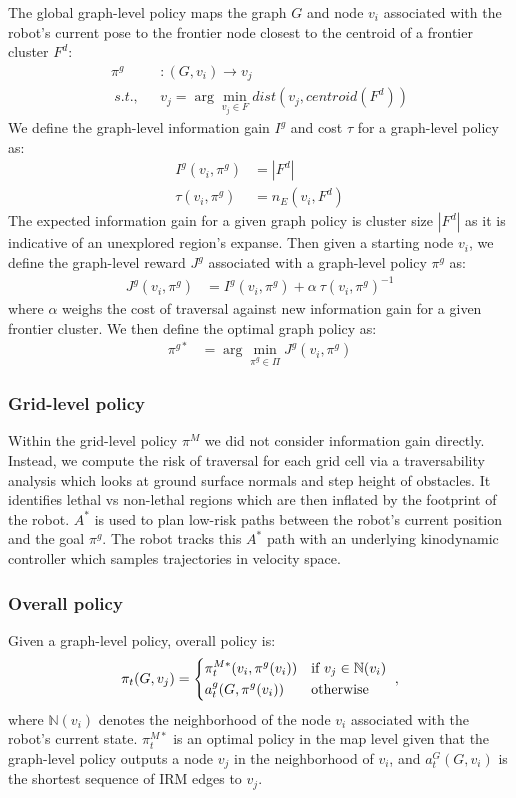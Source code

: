 \documentclass{article}
\begin{document}
The global graph-level policy maps the graph $G$ and node $v_i$ associated with the robot's current pose to the frontier node closest to the centroid of a frontier cluster $F^d$:
\begin{align}
  \pi^g&: (G,v_i) \rightarrow v_{j} \nonumber \\
  ~s.t.,~~~ &v_j= \arg\min_{v_j \in F} dist(v_{j}, centroid(F^d))
\end{align}
We define the graph-level information gain $I^g$ and cost $\tau$ for a graph-level policy as:
\begin{align}
    I^g(v_i,\pi^g) &= |F^d| \nonumber \\
    \tau(v_i,\pi^g) &= n_E(v_i,F^d) 
\end{align}
The expected information gain for a given graph policy is cluster size $|F^d|$ as it is indicative of an unexplored region's expanse. Then given a starting node $v_i$, we define the graph-level reward $J^g$ associated with a graph-level policy $\pi^g$ as: 
\begin{align}
    J^{g}(v_i, \pi^g) &= I^g(v_i,\pi^g) + \alpha~\tau(v_i,\pi^g)^{-1}
\end{align}
where $\alpha$ weighs the cost of traversal against new information gain for a given frontier cluster. We then define the optimal graph policy as:
\begin{align}
    \pi^{g*} &= \arg\min_{\pi^g \in \Pi} J^{g}(v_i, \pi^g) \nonumber
\end{align}

\subsubsection{Grid-level policy}
Within the grid-level policy $\pi^M$ we did not consider information gain directly.  Instead, we compute the risk of traversal for each grid cell via a traversability analysis which looks at ground surface normals and step height of obstacles.  It identifies lethal vs non-lethal regions which are then inflated by the footprint of the robot.  $A^*$ is used to plan low-risk paths between the robot's current position and the goal $\pi^g$.  The robot tracks this $A^*$ path with an underlying kinodynamic controller which samples trajectories in velocity space.

\subsubsection{Overall policy}
Given a graph-level policy, overall policy is:
\begin{align}
  \pi_t(G, v_j) = 
  \begin{dcases*}
    \pi_t^{M*}(v_i, \pi^g(v_i)) & if $v_j \in \mathbb{N}(v_i)$ \\
    a_t^g(G, \pi^g(v_i)) & otherwise 
  \end{dcases*},
\end{align}
where $\mathbb{N}(v_i)$ denotes the neighborhood of the node $v_i$ associated with the robot's current state. $\pi_t^{M*}$ is an optimal policy in the map level given that the graph-level policy outputs a node $v_j$ in the neighborhood of $v_i$, and $a_t^G(G, v_i)$ is the shortest sequence of IRM edges to $v_j$.
\end{document}
